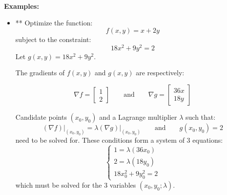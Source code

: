 \documentclass{article}
\begin{document}
\vspace{5mm}

\textbf{Examples:}
\begin{itemize}
\item** Optimize the function:
\[f(x,y) = x + 2y\]
subject to the constraint:
\[18x^2 + 9y^2 = 2\]
Let \(g(x,y) = 18x^2 + 9y^2\).

The gradients of \(f(x, y)\) and \(g(x, y)\) are respectively:

\[\nabla f = \begin{bmatrix}
1 \\ 
2 
\end{bmatrix}
\quad\quad\text{and}\quad\quad
\nabla g = \begin{bmatrix}
36x \\ 
18y 
\end{bmatrix}\]

Candidate points \((x_0, y_0)\) and a Lagrange multiplier \(\lambda\) such that:
\[(\nabla f)\Big|_{(x_0,y_0)} = \lambda (\nabla g)\Big|_{(x_0, y_0)} 
\quad\quad\text{and}\quad\quad 
g(x_0, y_0) = 2\]
need to be solved for. These conditions form a system of 3 equations:
\[\left\{\begin{array}{c}
1 = \lambda (36x_0) \\ 
2 = \lambda (18y_0) \\ 
18x_0^2 + 9y_0^2 = 2
\end{array}\right.\]
which must be solved for the 3 variables \((x_0, y_0; \lambda)\).


\end{itemize}
\end{document}
